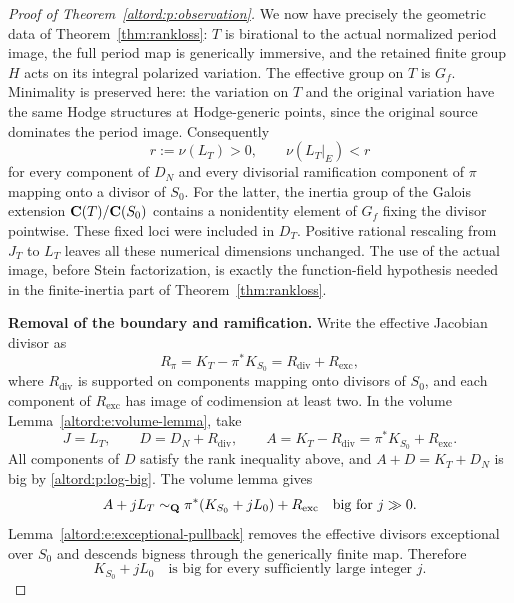 \begin{proof}[Proof of Theorem~\ref{altord:p:observation}]
We now have precisely the geometric data of
Theorem~\ref{thm:rankloss}: $T$ is birational to the actual normalized
period image, the full period map is generically immersive, and the
retained finite group $H$ acts on its integral polarized variation.
The effective group on $T$ is $G_f$. Minimality is preserved here:
the variation on $T$ and the original variation have the same
Hodge structures at Hodge-generic points, since the original source
dominates the period image. Consequently
\begin{equation}
 r:=\nu(L_T)>0,
 \qquad \nu(L_T|_E)<r
 \label{altord:p:rank-drop}
\end{equation}
for every component of $D_N$ and every divisorial ramification
component of $\pi$ mapping onto a divisor of $S_0$. For the latter,
the inertia group of the Galois extension $\mathbf C(T)/\mathbf C(S_0)$ contains
a nonidentity element of $G_f$ fixing the divisor pointwise. These
fixed loci were included in $D_T$. Positive rational rescaling from
$J_T$ to $L_T$ leaves all these numerical dimensions unchanged.
The use of the actual image, before Stein factorization, is exactly
the function-field hypothesis needed in the finite-inertia part of
Theorem~\ref{thm:rankloss}.

\medskip\noindent
\textbf{Removal of the boundary and ramification.}
Write the effective Jacobian divisor as
\[
  R_\pi=K_T-\pi^*K_{S_0}
       =R_{\mathrm{div}}+R_{\mathrm{exc}},
\]
where $R_{\mathrm{div}}$ is supported on components mapping onto
divisors of $S_0$, and each component of $R_{\mathrm{exc}}$ has image
of codimension at least two.  In the volume
Lemma~\ref{altord:e:volume-lemma}, take
\[
  J=L_T,\qquad
  D=D_N+R_{\mathrm{div}},\qquad
  A=K_T-R_{\mathrm{div}}
   =\pi^*K_{S_0}+R_{\mathrm{exc}}.
\]
All components of $D$ satisfy the rank inequality above, and
$A+D=K_T+D_N$ is big by \eqref{altord:p:log-big}.  The volume lemma gives
\[
  A+jL_T
  \sim_{\mathbf Q}\pi^*(K_{S_0}+jL_0)+R_{\mathrm{exc}}
  \quad\text{big for }j\gg0.
\]
Lemma~\ref{altord:e:exceptional-pullback} removes the effective divisors
exceptional over $S_0$ and descends bigness through the generically
finite map.  Therefore
\begin{equation}
  K_{S_0}+jL_0\quad\text{is big for every sufficiently large integer }j.
  \label{altord:p:adjoint-big}
\end{equation}


\end{proof}
